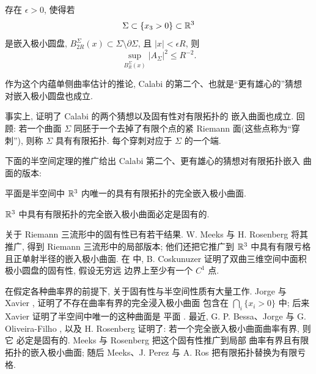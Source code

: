 \begin{corollary}
\label{cor:8.17}
存在 $\epsilon>0$, 使得若
\begin{equation}
\Sigma\subset\{x_3>0\}\subset\mathbb{R}^3
\label{eq:8.84}
\end{equation}
是嵌入极小圆盘, $B_{2R}^\Sigma(x)\subset\Sigma\setminus\partial\Sigma$, 且
$|x|<\epsilon R$, 则
\begin{equation}
\sup_{B_R^\Sigma(x)}|A_\Sigma|^2\leq R^{-2}.
\label{eq:8.85}
\end{equation}
\end{corollary}

作为这个内蕴单侧曲率估计的推论, Calabi 的第二个、也就是``更有雄心的''猜想
对嵌入极小圆盘也成立.

事实上, \cite{CM24} 证明了 Calabi 的两个猜想以及固有性对有限拓扑的
嵌入曲面也成立. 回顾: 若一个曲面 $\Sigma$ 同胚于一个去掉了有限个点的紧
Riemann 面(这些点称为``穿刺''), 则称 $\Sigma$ 具有有限拓扑. 每个穿刺对应于
$\Sigma$ 的一个端.

下面的半空间定理的推广给出 Calabi 第二个、更有雄心的猜想对有限拓扑嵌入
曲面的版本:

\begin{theorem}
\label{thm:8.18}
平面是半空间中 $\mathbb{R}^3$ 内唯一的具有有限拓扑的完全嵌入极小曲面.
\end{theorem}

\begin{theorem}
\label{thm:8.19}
$\mathbb{R}^3$ 中具有有限拓扑的完全嵌入极小曲面必定是固有的.
\end{theorem}

关于 Riemann 三流形中的固有性已有若干结果. W. Meeks 与 H. Rosenberg
\cite{MeR3} 将其推广, 得到 Riemann 三流形中的局部版本; 他们还把它推广到
$\mathbb{R}^3$ 中具有有限亏格且正单射半径的嵌入极小曲面. 在 \cite{Cb} 中,
B. Coskunuzer 证明了双曲三维空间中面积极小圆盘的固有性, 假设无穷远
边界上至少有一个 $C^1$ 点.

在假定各种曲率界的前提下, 关于固有性与半空间性质有大量工作. Jorge 与
Xavier \cite{JXa1}, \cite{JXa2} 证明了不存在曲率有界的完全浸入极小曲面
包含在 $\bigcap_i\{x_i>0\}$ 中; 后来 Xavier 证明了半空间中唯一的这种曲面是
平面 \cite{Xa}. 最近, G. P. Bessa、Jorge 与 G. Oliveira-Filho \cite{BJO},
以及 H. Rosenberg \cite{Ro} 证明了: 若一个完全嵌入极小曲面曲率有界, 则它
必定是固有的. Meeks 与 Rosenberg \cite{MeR2} 把这个固有性推广到局部
曲率有界且有限拓扑的嵌入极小曲面; 随后 Meeks、J. Perez 与 A. Ros
\cite{MePRs1} 把有限拓扑替换为有限亏格.

